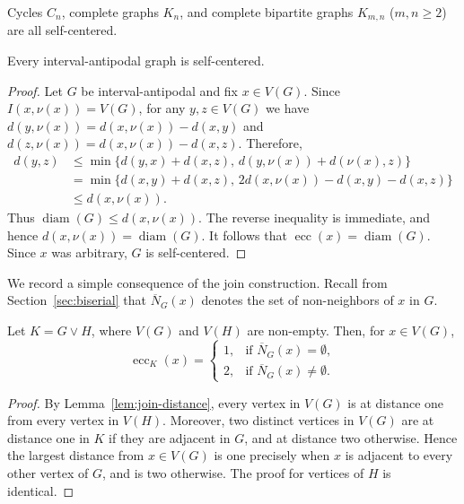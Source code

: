 \documentclass[a4paper,leqno]{amsart}
\begin{document}
\begin{eg}\label{eg:self-centered eg}
Cycles $C_n$, complete graphs $K_n$, and complete bipartite graphs $K_{m,n}$ ($m,n\geq 2$) are all self-centered. 
\end{eg}

\begin{prop}
Every interval-antipodal graph is self-centered.
\end{prop}
\begin{proof}
Let $G$ be interval-antipodal and fix $x\in V(G)$. Since $I(x,\nu(x))=V(G)$,
for any $y,z\in V(G)$ we have $d(y,\nu(x))=d(x,\nu(x))-d(x,y)$ and $d(z,\nu(x))=d(x,\nu(x))-d(x,z)$. Therefore,
\begin{align*}
d(y,z)
&\leq \min\bigl\{
d(y,x)+d(x,z),\,
d(y,\nu(x))+d(\nu(x),z)
\bigr\}\\
&=\min\bigl\{
d(x,y)+d(x,z),\,
2d(x,\nu(x))-d(x,y)-d(x,z)
\bigr\}\\
&\leq d(x,\nu(x)).
\end{align*}
Thus $\operatorname{diam}(G)\leq d(x,\nu(x))$. The reverse inequality is immediate, and hence $d(x,\nu(x))=\operatorname{diam}(G)$. It follows that $\operatorname{ecc}(x)=\operatorname{diam}(G)$. Since $x$ was arbitrary, $G$ is self-centered.
\end{proof}

We record a simple consequence of the join construction. Recall from Section~\ref{sec:biserial} that $\overline N_G(x)$ denotes the set of non-neighbors of $x$ in $G$.

\begin{lem}\label{lem:join-eccentricity}
Let $K=G\vee H$, where $V(G)$ and $V(H)$ are non-empty. Then, for
$x\in V(G)$,
$$\operatorname{ecc}_K(x)=
\begin{cases}
1, & \text{if } \overline N_G(x)=\emptyset,\\
2, & \text{if } \overline N_G(x)\neq\emptyset.
\end{cases}
$$
\end{lem}

\begin{proof}
By Lemma~\ref{lem:join-distance}, every vertex in $V(G)$ is at distance
one from every vertex in $V(H)$. Moreover, two distinct vertices in $V(G)$ are at distance one in $K$ if they are adjacent in $G$, and at distance two otherwise. Hence the largest distance from $x\in V(G)$ is one precisely when $x$ is adjacent to every other vertex of $G$, and is two otherwise. The proof for vertices of $H$ is identical.
\end{proof}
\end{document}
